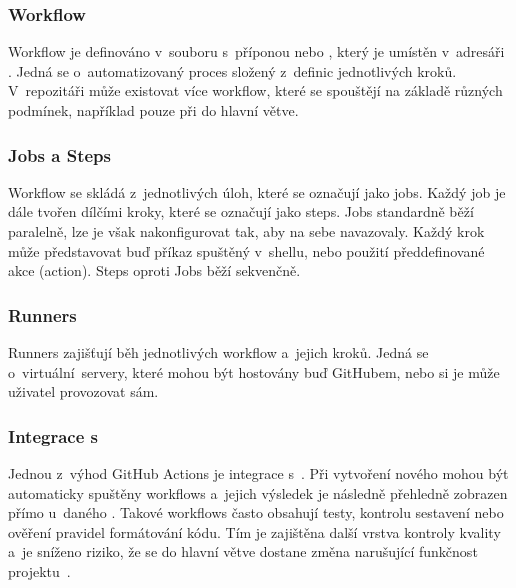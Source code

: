 \subsubsection*{Workflow}
\label{subsubsec:github:actions_workflow}
Workflow je definováno v~souboru s~příponou  nebo , který je umístěn v~adresáři . Jedná se o~automatizovaný proces složený z~definic jednotlivých kroků. V~repozitáři může existovat více workflow, které se spouštějí na základě různých podmínek, například pouze při  do hlavní větve.

\subsubsection*{Jobs a Steps}
\label{subsubsec:github:actions_jobs_steps}
Workflow se skládá z~jednotlivých úloh, které se označují jako jobs. Každý job je dále tvořen dílčími kroky, které se označují jako steps. Jobs standardně běží paralelně, lze je však nakonfigurovat tak, aby na sebe navazovaly. Každý krok může představovat buď příkaz spuštěný v~shellu, nebo použití předdefinované akce (action). Steps oproti Jobs běží sekvenčně.

\subsubsection*{Runners}
\label{subsubsec:github:actions_runners}
Runners zajišťují běh jednotlivých workflow a~jejich kroků. Jedná se o~virtuální~servery, které mohou být hostovány buď GitHubem, nebo si je může uživatel provozovat sám.

\subsubsection*{Integrace s \PR}
\label{subsubsec:github:actions_pr}
Jednou z~výhod GitHub Actions je integrace s~\PR. Při vytvoření nového \PR mohou být automaticky spuštěny workflows a~jejich výsledek je následně přehledně zobrazen přímo u~daného \PR. Takové workflows často obsahují testy, kontrolu sestavení nebo ověření pravidel formátování kódu. Tím je zajištěna další vrstva kontroly kvality a~je sníženo riziko, že se do hlavní větve dostane změna narušující funkčnost projektu~\cite{github_actions_docs,github_pull_requests_docs}.